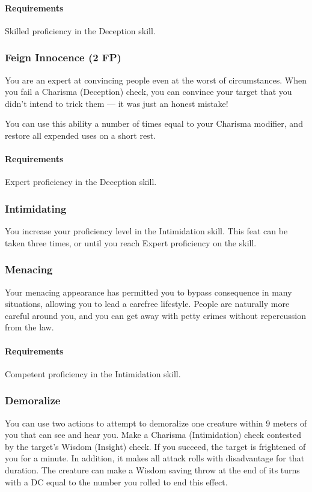     \paragraph{Requirements} Skilled proficiency in the Deception skill.
\subsubsection{Feign Innocence (2 FP)} \label{feat::feigninnocence}
    You are an expert at convincing people even at the worst of circumstances.
    When you fail a Charisma (Deception) check, you can convince your target that you didn't intend to trick them --- it was just an honest mistake!

    You can use this ability a number of times equal to your Charisma modifier, and restore all expended uses on a short rest.
    \paragraph{Requirements} Expert proficiency in the Deception skill.
\subsubsection{Intimidating} \label{feat::intimidating}
    You increase your proficiency level in the Intimidation skill.
    This feat can be taken three times, or until you reach Expert proficiency on the skill.
\subsubsection{Menacing} \label{feat::menacing}
    Your menacing appearance has permitted you to bypass consequence in many situations, allowing you to lead a carefree lifestyle.
    People are naturally more careful around you, and you can get away with petty crimes without repercussion from the law.
    \paragraph{Requirements} Competent proficiency in the Intimidation skill.
\subsubsection{Demoralize} \label{feat::demoralize}
    You can use two actions to attempt to demoralize one creature within 9 meters of you that can see and hear you.
    Make a Charisma (Intimidation) check contested by the target's Wisdom (Insight) check.
    If you succeed, the target is frightened of you for a minute.
    In addition, it makes all attack rolls with disadvantage for that duration.
    The creature can make a Wisdom saving throw at the end of its turns with a DC equal to the number you rolled to end this effect.

